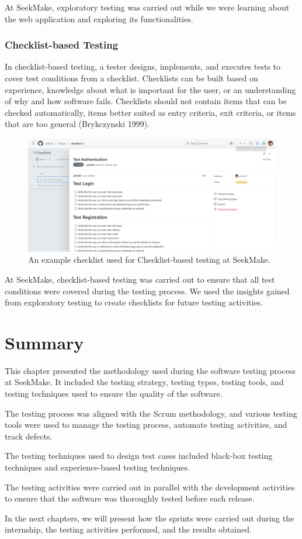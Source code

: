 At SeekMake, exploratory testing was carried out while we were learning about the web application and exploring its functionalities.
\subsubsection{Checklist-based Testing}
In checklist-based testing, a tester designs, implements, and executes tests to cover test conditions from
a checklist. Checklists can be built based on experience, knowledge about what is important for the user,
or an understanding of why and how software fails. Checklists should not contain items that can be
checked automatically, items better suited as entry criteria, exit criteria, or items that are too general
(Brykczynski 1999). \cite{istqbctfl4.0.1}

\begin{figure}[H]
    \centering
    \includegraphics[width=\textwidth]{project/images/checklist.png}
    \caption{An example checklist used for Checklist-based testing at SeekMake.}
    \label{fig:gh-checklist}
\end{figure}

At SeekMake, checklist-based testing was carried out to ensure that all test conditions were covered during the testing process. We used the insights gained from exploratory testing to create checklists for future testing activities.

\section{Summary}
This chapter presented the methodology used during the software testing process at SeekMake. It included the testing strategy, testing types, testing tools, and testing techniques used to ensure the quality of the software.

The testing process was aligned with the Scrum methodology, and various testing tools were used to manage the testing process, automate testing activities, and track defects.

The testing techniques used to design test cases included black-box testing techniques and experience-based testing techniques.

The testing activities were carried out in parallel with the development activities to ensure that the software was thoroughly tested before each release.

In the next chapters, we will present how the sprints were carried out during the internship, the testing activities performed, and the results obtained.
